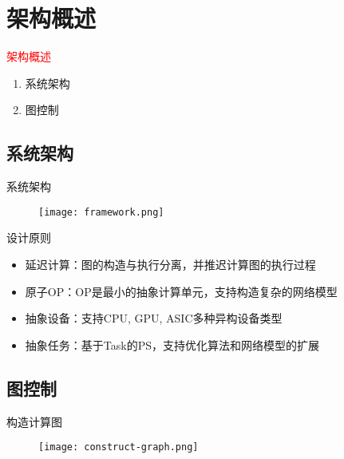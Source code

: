 \section{架构概述}
\label{sec:overview}

\begin{frame}
  \begin{center}
    \Huge{\textcolor{red}{架构概述}}
  \end{center}

  \begin{enumerate}
    \item \alert{系统架构}
    \item \alert{图控制}
  \end{enumerate}    
\end{frame}

\subsection{系统架构}

\begin{frame}{系统架构}
  \begin{figure}
    \centering
    \texttt{[image: framework.png]}
  \end{figure}
\end{frame}

\begin{frame}{设计原则}
    \begin{itemize}
      \item \alert{延迟计算}：图的构造与执行分离，并推迟计算图的执行过程
      \item \alert{原子OP}：OP是最小的抽象计算单元，支持构造复杂的网络模型
      \item \alert{抽象设备}：支持CPU, GPU, ASIC多种异构设备类型
      \item \alert{抽象任务}：基于Task的PS，支持优化算法和网络模型的扩展
    \end{itemize}
\end{frame}

\subsection{图控制}

\begin{frame}{构造计算图}
  \begin{figure}
    \centering
    \texttt{[image: construct-graph.png]}
  \end{figure}
\end{frame}

